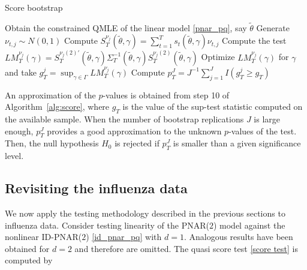 \begin{algorithm}
	\caption{Score bootstrap}\label{alg:score}
	\begin{algorithmic}[1]
		\State Obtain the constrained QMLE  of the linear model \eqref{pnar_pq}, say $\tilde{\theta}$ 
		\State Generate $ \nu_{t,j} \sim N(0,1)$
		\EndFor
		\State Compute $S^{\nu_j}_T(\tilde{\theta}, \gamma)=\sum_{t=1}^{T}s_{t}(\tilde{\theta}, \gamma)\nu_{t,j}$
		\State Compute the test $LM^{\nu_j}_T(\gamma)=S^{\nu_j (2) \prime}_T(\tilde{\theta}, \gamma) \Sigma^{-1}_{T}(\tilde{\theta}, \gamma) S^{\nu_j (2)}_T(\tilde{\theta}, \gamma)$
		\State Optimize $LM^{\nu_j}_T(\gamma)$ for $\gamma$ and take $g^j_T=\sup_{\gamma\in\Gamma}LM^{\nu_j}_T(\gamma)$
		\EndFor
		\State Compute $p^J_T=J^{-1}\sum_{j=1}^{J}I(g^j_T\geq g_T)$
	\end{algorithmic}
\end{algorithm}


An approximation of the $p$-values is obtained from step 10 of Algorithm~\ref{alg:score}, where $g_T$ is the value of the sup-test statistic computed on the available sample.
When  the number of bootstrap replications $J$ is large enough,  $ p^J_T$ provides  a good approximation to  the unknown $p$-values of the test. Then, the null hypothesis $H_0$ is rejected if $p^J_T$ is smaller than a given significance level. 


\subsection{Revisiting the  influenza data}
\label{subsec: Applications extensions}


We now apply the testing methodology described in the previous sections to influenza data.
Consider  testing linearity of the  PNAR($2$) model against the nonlinear ID-PNAR($2$)  \eqref{id_pnar_pq}
with $d=1$. Analogous results have been obtained for $d=2$ and therefore are omitted. The quasi score test \eqref{score test}  is computed by


